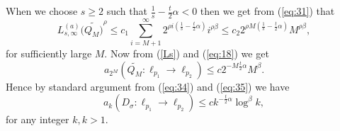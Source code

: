 \documentclass[12pt]{article}
\begin{document}
When we choose $s\geq 2$ such that  $\frac{1}{s}-\frac{t}{2}\alpha <0$ then  we get from (\ref{eq:31}) that 
\begin{equation}
	L_{s,\infty}^{(a)}(\widetilde{Q_M)}^\rho\leq c_1\sum_{i=M+1}^{\infty} 2^{\rho i(\frac{1}{s}-\frac{t}{2}\alpha)}i^{\rho\beta}\leq c_2 2^{\rho M(\frac{1}{s}-\frac{t}{2}\alpha)}M^{\rho\beta}, 
	\label{eq:18}
\end{equation}
for sufficiently large $M$. Now from (\ref{Ls}) and (\ref{eq:18}) we get
\begin{equation}
	a_{2^M}(\widetilde{Q_M}:\ell_{p_1}\rightarrow \ell_{p_2})\leq c 2^{ -M\frac t 2\alpha }M^\beta.
	\label{eq:35}
\end{equation}
Hence by standard argument from (\ref{eq:34}) and (\ref{eq:35}) we have
\begin{equation*}
	a_{k}(D_\sigma:\ell_{p_1}\rightarrow \ell_{p_2})\leq c k^{ -\frac t 2\alpha }\log^\beta k,
\end{equation*}
for any integer $k, k>1$.
\end{document}
